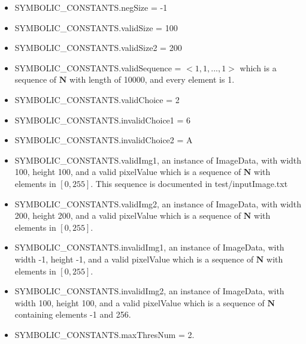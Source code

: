 \documentclass[12pt, titlepage]{article}
\begin{document}
\begin{itemize}
\item SYMBOLIC\_CONSTANTS.negSize = -1
\item SYMBOLIC\_CONSTANTS.validSize = 100
\item SYMBOLIC\_CONSTANTS.validSize2 = 200
\item SYMBOLIC\_CONSTANTS.validSequence = $<1,1,...,1>$ which is a sequence of
$\mathbf{N}$ with length of 10000, and every element is 1.
\item SYMBOLIC\_CONSTANTS.validChoice = 2
\item SYMBOLIC\_CONSTANTS.invalidChoice1 = 6
\item SYMBOLIC\_CONSTANTS.invalidChoice2 = A
\item SYMBOLIC\_CONSTANTS.validImg1, an instance of ImageData, with width 100,
height 100, and a valid pixelValue which is a sequence of $\mathbf{N}$ with
elements in $[0,255]$. This sequence is documented in test/inputImage.txt
\item SYMBOLIC\_CONSTANTS.validImg2, an instance of ImageData, with width 200,
height 200, and a valid pixelValue which is a sequence of $\mathbf{N}$ with
elements in $[0,255]$.
\item SYMBOLIC\_CONSTANTS.invalidImg1, an instance of ImageData, with width -1,
height -1, and a valid pixelValue which is a sequence of $\mathbf{N}$ with
elements in $[0,255]$.
\item SYMBOLIC\_CONSTANTS.invalidImg2, an instance of ImageData, with width 100,
height 100, and a valid pixelValue which is a sequence of $\mathbf{N}$
containing elements -1 and 256.
\item SYMBOLIC\_CONSTANTS.maxThresNum = 2.
\end{itemize}
\end{document}

